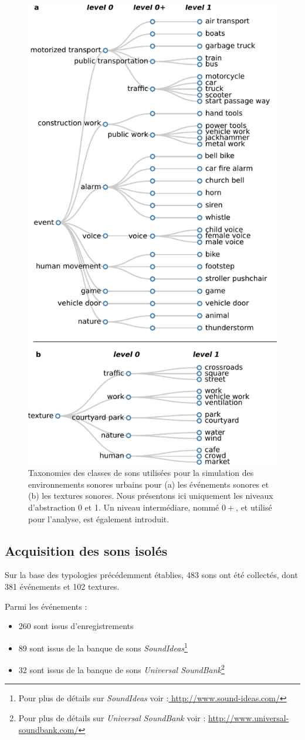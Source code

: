 
\begin{figure}[bth]
        \myfloatalign
        \includegraphics[width=.5\linewidth]{gfxHierarchy/taxonomy}
       \caption[Taxonomies des classes de sons utilisées pour la simulation des environnements sonores urbains]{Taxonomies des classes de sons utilisées pour la simulation des environnements sonores urbains pour (a) les événements sonores et (b) les textures sonores. Nous présentons ici uniquement les niveaux d'abstraction 0 et 1. Un niveau intermédiare, nommé $0+$, et utilisé pour l'analyse, est également introduit.}\label{fig:taxonomie}
\end{figure}

\subsection{Acquisition des sons isolés}

Sur la base des typologies précédemment établies,  483 sons ont été collectés, dont 381  événements et 102  textures.

Parmi les événements :

\begin{itemize}
\item 260 sont issus d’enregistrements
\item 89 sont issus de la banque de sons \emph{SoundIdeas}\footnote{Pour plus de détails sur \emph{SoundIdeas} voir :\url{ http://www.sound-ideas.com/}}
\item 32 sont issus de la banque de sons \emph{Universal SoundBank}\footnote{Pour plus de détails sur \emph{Universal SoundBank} voir : \url{http://www.universal-soundbank.com/}}
\end{itemize}

